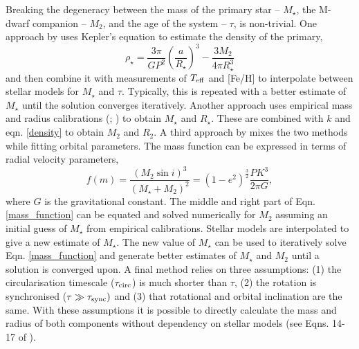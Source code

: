 Breaking the degeneracy between the mass of the primary star -- $M_{\star}$, the M-dwarf companion -- $M_2$, and the age of the system -- $\tau$, is non-trivial. One approach by \citet{2009ApJ...693.1920H} uses Kepler's equation to estimate the density of the primary,
%
\begin{equation}\label{density}
\rho_{\star} = \frac{3 \pi}{GP^2} \left( \frac{a}{R_{\star}} \right)^3 - \frac{3M_2}{4 \pi R_{\star}^3}
\end{equation}
%
and then combine it with measurements of $T_{\rm eff}$ and [Fe/H] to interpolate between stellar models for $M_{\star}$ and $\tau$. Typically, this is repeated with a better estimate of $M_{\star}$ until the solution converges iteratively. Another approach uses empirical mass and radius calibrations (\citealt{2011MNRAS.417.2166S}; \citealt{2013AN....334....4T}) to obtain $M_{\star}$ and $R_{\star}$.  These are combined with $k$ and eqn. \ref{density} to obtain $M_2$ and $R_2$. A third approach by \citet{2013A&A...549A..18T} mixes the two methods while fitting orbital parameters. The mass function \citep{Hilditch2001} can be expressed in terms of radial velocity parameters,
%
\begin{equation}\label{mass_function}
f(m)  =  \frac{(M_2 \sin i)^3}{(M_{\star} + M_2)^2} =  (1-e^2)^{\frac{3}{2}} \frac{P K^3}{2 \pi G},
\end{equation}
%
where $G$ is the gravitational constant. The middle and right part of Eqn. \ref{mass_function} can be equated and solved numerically for $M_2$ assuming an initial guess of $M_{\star}$ from empirical calibrations. Stellar models are interpolated to give a new estimate of $M_{\star}$. The new value of $M_{\star}$ can be used to iteratively solve Eqn. \ref{mass_function} and generate better estimates of $M_{\star}$ and $M_2$ until a solution is converged upon. A final method relies on three assumptions: (1) the circularisation timescale ($\tau_{\rm circ}$) is much shorter than $\tau$, (2) the rotation is synchronised ($\tau \gg \tau_{\rm sync})$ and (3) that rotational and orbital inclination are the same. With these assumptions it is possible to directly calculate the mass and radius of both components without dependency on stellar models (see Eqns. 14-17 of \citealt{2007ApJ...663..573B}).

